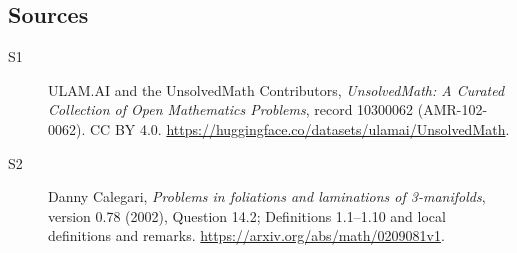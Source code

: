 \documentclass[11pt]{article}
\begin{document}
\subsection{Sources}
\begin{description}
\item[\hypertarget{source:10300062:1}{S1}] ULAM.AI and the UnsolvedMath Contributors, \emph{UnsolvedMath: A Curated Collection of Open Mathematics Problems}, record 10300062 (AMR-102-0062). CC BY 4.0. \url{https://huggingface.co/datasets/ulamai/UnsolvedMath}.
\item[\hypertarget{source:10300062:2}{S2}] Danny Calegari, \emph{Problems in foliations and laminations of 3-manifolds}, version 0.78 (2002), Question 14.2; Definitions 1.1--1.10 and local definitions and remarks. \url{https://arxiv.org/abs/math/0209081v1}.
\end{description}
\label{end:10300062}
\end{document}

